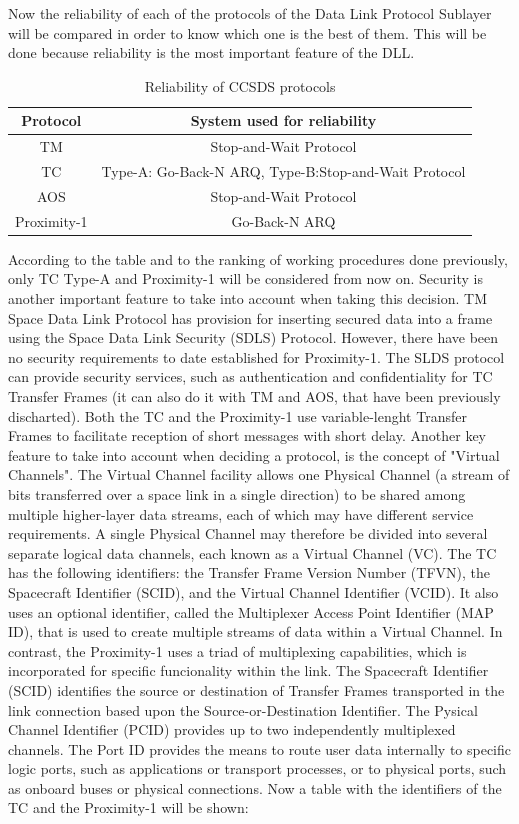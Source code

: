 Now the reliability of each of the protocols of the Data Link Protocol Sublayer will be compared in order to know which one is the best of them. This will be done because reliability is the most important feature of the DLL.
\begin{table}[H]
\begin{center}
\begin{tabular}{|c|c|}
\hline
\textbf{Protocol}&\textbf{System used for reliability}\\
\hline
TM&Stop-and-Wait Protocol\\
\hline
TC&Type-A: Go-Back-N ARQ, Type-B:Stop-and-Wait Protocol\\
\hline
AOS&Stop-and-Wait Protocol\\
\hline
Proximity-1&Go-Back-N ARQ\\
\hline
\end{tabular}
\caption{Reliability of CCSDS protocols}
\end{center}
\end{table}
According to the table and to the ranking of working procedures done previously, only TC Type-A and Proximity-1 will be considered from now on. Security is another important feature to take into account when taking this decision. TM Space Data Link Protocol has provision for inserting secured data into a frame using the Space Data Link Security (SDLS) Protocol. However, there have been no security requirements to date established for Proximity-1. The SLDS protocol can provide security services, such as authentication and confidentiality for TC Transfer Frames (it can also do it with TM and AOS, that have been previously discharted). Both the TC and the Proximity-1 use variable-lenght Transfer Frames to facilitate reception of short messages with short delay. Another key feature to take into account when deciding a protocol, is the concept of "Virtual Channels". The
Virtual Channel facility allows one Physical Channel (a stream of bits transferred over a
space link in a single direction) to be shared among multiple higher-layer data streams, each
of which may have different service requirements. A single Physical Channel may therefore
be divided into several separate logical data channels, each known as a Virtual Channel
(VC). The TC has the following identifiers: the Transfer Frame Version Number (TFVN), the Spacecraft Identifier (SCID), and the Virtual Channel Identifier (VCID). It also uses an optional identifier, called the Multiplexer Access Point Identifier (MAP ID), that is used to create multiple streams of data within a Virtual Channel. In contrast, the Proximity-1 uses a triad of multiplexing capabilities, which is incorporated for specific funcionality within the link. The Spacecraft Identifier (SCID) identifies the source or destination of Transfer Frames transported in the link connection based upon the Source-or-Destination Identifier. The Pysical Channel Identifier (PCID) provides up to two independently multiplexed channels. The Port ID provides the means to route user data internally to specific logic ports, such as applications or transport processes, or to physical ports, such as onboard buses or physical connections. Now a table with the identifiers of the TC and the Proximity-1 will be shown:
